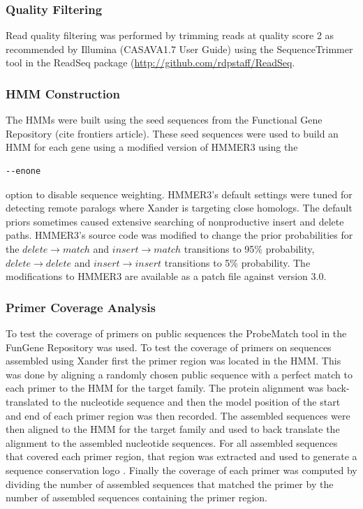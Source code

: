 \documentclass[10pt]{bmc_article}
\newenvironment{bmcformat}{\begin{raggedright}\baselineskip20pt\sloppy\setboolean{publ}{false}}{\end{raggedright}\baselineskip20pt\sloppy}
\begin{document}
\begin{bmcformat}
\subsubsection*{Quality Filtering}
Read quality filtering was performed by trimming reads at quality score 2 as recommended by Illumina (CASAVA1.7 User Guide) using the SequenceTrimmer tool in the ReadSeq package (\url{http://github.com/rdpstaff/ReadSeq}.

\subsubsection*{HMM Construction}
The HMMs were built using the seed sequences from the Functional Gene Repository (cite frontiers article).  These seed sequences were used to build an HMM for each gene using a modified version of HMMER3 using the \begin{verbatim}--enone\end{verbatim} option to disable sequence weighting. HMMER3's default settings were tuned for detecting remote paralogs\cite{johnson_division_2006} where Xander is targeting close homologs.  The default priors sometimes caused extensive searching of nonproductive insert and delete paths. HMMER3's source code was modified to change the prior probabilities for the $delete \rightarrow match$ and $insert \rightarrow match$ transitions to 95\% probability, $delete \rightarrow delete$ and $insert \rightarrow insert$ transitions to 5\% probability.  The modifications to HMMER3 are available as a patch file against version 3.0.

\subsubsection*{Primer Coverage Analysis}
To test the coverage of primers on public sequences the ProbeMatch tool in the FunGene Repository was used.  To test the coverage of primers on sequences assembled using Xander first the primer region was located in the HMM.  This was done by aligning a randomly chosen public sequence with a perfect match to each primer to the HMM for the target family.  The protein alignment was back-translated to the nucleotide sequence and then the model position of the start and end of each primer region was then recorded.  The assembled sequences were then aligned to the HMM for the target family and used to back translate the alignment to the assembled nucleotide sequences.  For all assembled sequences that covered each primer region, that region was extracted and used to generate a sequence conservation logo \cite{schneider_sequence_1990}.  Finally the coverage of each primer was computed by dividing the number of assembled sequences that matched the primer by the number of assembled sequences containing the primer region.


\end{bmcformat}
\end{document}
